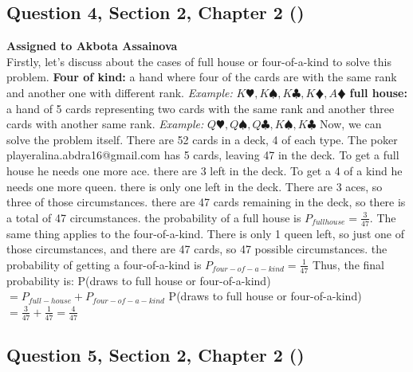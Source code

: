 \documentclass[12pt, a4paper]{article}
\begin{document}
\subsection*{Question 4, Section 2, Chapter 2 (\cite{boyce11th})}

\noindent\textbf{Assigned to Akbota Assainova}\\

\noindent Firstly, let's discuss about the cases of full house or four-of-a-kind to solve this problem. 
\newline 
\textbf{Four of kind:} 
a hand where four of the cards are with the same rank and another one with different rank. \textit{Example:} $K\varheartsuit, K\spadesuit, K\clubsuit, K\vardiamondsuit, A\vardiamondsuit$
\newline
\textbf{full house:} 
 a hand of 5 cards representing two cards with the same rank and another three cards with another same rank. \textit{Example:} $Q\varheartsuit, Q\spadesuit, Q\clubsuit, K\spadesuit, K\clubsuit$ 
\newline
Now, we can solve the problem itself.
\newline
There are 52 cards in a deck, 4 of each type.
The poker playeralina.abdra16@gmail.com has 5 cards, leaving 47 in the deck.
To get a full house he needs one more ace. there are 3 left in the deck.
To get a 4 of a kind he needs one more queen. there is only one left in the deck.
\newline
There are 3 aces, so three of those circumstances. there are 47 cards remaining in the deck, so there is a total of 47 circumstances. the probability of a full house is $P_{full house}=\frac{3}{47}$.
\newline
The same thing applies to the four-of-a-kind. There is only 1 queen left, so just one of those circumstances, and there are 47 cards, so 47 possible circumstances. the probability of getting a four-of-a-kind is $P_{four-of-a-kind}=\frac{1}{47}$
\newline
Thus, the final probability is: 
\newline 
P(draws to full house or four-of-a-kind)$=P_{full-house} + P_{four-of-a-kind}$
\newline
P(draws to full house or four-of-a-kind)$=\frac{3}{47}+\frac{1}{47}=\frac{4}{47}$


\subsection*{Question 5, Section 2, Chapter 2 (\cite{boyce11th})}
\end{document}
